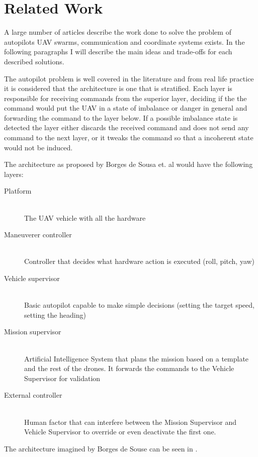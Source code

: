\chapter{Related Work}
\label{chapter:related-work}

A large number of articles describe the work done to solve the problem of autopilots
UAV swarms, communication and coordinate systems exists. In the following paragraphs
I will describe the main ideas and trade-offs for each described solutions.

The autopilot problem is well covered in the literature and from real life practice
it is considered that the architecture is one that is stratified. Each layer
is responsible for receiving commands from the superior layer, deciding if the
the command would put the UAV in a state of imbalance or danger in general and
forwarding the command to the layer below. If a possible imbalance state is detected
the layer either discards the received command and does not send any command to 
the next layer,  or it tweaks the command so that a incoherent state would not
be induced.

The architecture as proposed by Borges de Sousa et. al \cite{pivant} would have
the following layers:

\begin{description}
\item[Platform] \hfill \\ The UAV vehicle with all the hardware
\item[Maneuverer controller] \hfill \\ Controller that decides what hardware action is 
executed (roll, pitch, yaw)
\item[Vehicle supervisor] \hfill \\ Basic autopilot capable to make simple decisions 
(setting the target speed,  setting the heading)
\item[Mission supervisor] \hfill \\ Artificial Intelligence System that plans the mission
based on a template and the rest of the drones. It forwards the commands to the
Vehicle Supervisor for validation
\item[External controller] \hfill \\ Human factor that can interfere between the Mission
Supervisor and Vehicle Supervisor to override or even deactivate the first one.
\end{description}

The architecture imagined by Borges de Souse can be seen in .

